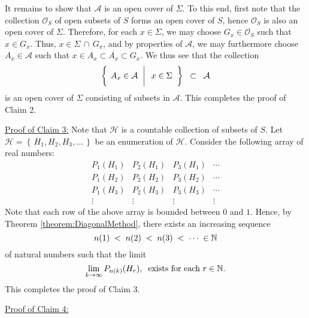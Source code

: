 \vskip 0.3cm
\noindent
It remains to show that $\mathcal{A}$ is an open cover of $\Sigma$.
To this end, first note that the collection $\mathcal{O}_{S}$ of open subsets of $S$
forms an open cover of $S$, hence $\mathcal{O}_{S}$ is also an open cover of $\Sigma$.
Therefore, for each $x \in \Sigma$, we may choose $G_{x} \in \mathcal{O}_{S}$
such that $x \in G_{x}$.
Thus, $x \in \Sigma\,\cap\,G_{x}$, and by properties of $\mathcal{A}$,
we may furthermore choose $A_{x} \in \mathcal{A}$ such that
$x \in A_{x} \subset \overline{A_{x}} \subset G_{x}$.
We thus see that the collection
\begin{equation*}
\left\{\;
\left.
A_{x} \in \overset{{\color{white}u}}{\mathcal{A}}
\;\;\right\vert\;\;
x \in \Sigma
\;\;\right\}
\;\; \subset \;\; \mathcal{A}
\end{equation*}
is an open cover of $\Sigma$ consisting of subsets in $\mathcal{A}$.
This completes the proof of Claim 2.

\vskip 0.5cm
\noindent
\underline{Proof of Claim 3:}\quad
Note that $\mathcal{H}$ is a countable collection of subsets of $S$.
Let $\mathcal{H} = \left\{\,H_{1}, H_{2}, H_{3}, \ldots \,\right\}$ be an enumeration of $\mathcal{H}$.
Consider the following array of real numbers:
\begin{equation*}
\begin{array}{cccc}
P_{1}(H_{1}) & P_{2}(H_{1}) & P_{3}(H_{1}) & \cdots \\
P_{1}(H_{2}) & P_{2}(H_{2}) & P_{3}(H_{2}) & \cdots \\
P_{1}(H_{3}) & P_{2}(H_{3}) & P_{3}(H_{3}) & \cdots \\
\vdots & \vdots & \vdots & \vdots  
\end{array}
\end{equation*}
Note that each row of the above array is bounded between $0$ and $1$.
Hence, by Theorem \ref{theorem:DiagonalMethod}, there exists an increasing sequence
\begin{equation*}
n(1) \;<\;
n(2) \;<\;
n(3) \;<\;
\cdots\; \in \mathbb{N}
\end{equation*}
of natural numbers such that the limit
\begin{equation*}
\lim_{k\rightarrow\infty} P_{n(k)}(H_{r}),
\;\;\textnormal{exists for each $r \in \mathbb{N}$}.
\end{equation*}
This completes the proof of Claim 3.

\vskip 0.5cm
\noindent
\underline{Proof of Claim 4:}\quad

